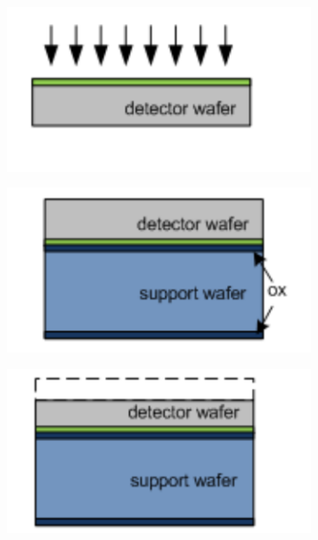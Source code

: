 \begin{figure}[htbp]
  \centering
  \begin{subfigure}[b]{0.3\textwidth}
    \centering
    \includegraphics[width=\textwidth]{figures/ActiveEdge/advacamProcess/wafer_1}
    \caption{}
  \end{subfigure}\hfill
  \begin{subfigure}[b]{0.3\textwidth}
    \includegraphics[width=\textwidth]{figures/ActiveEdge/advacamProcess/wafer_2}
    \caption{}
  \end{subfigure}\hfill
  \begin{subfigure}[b]{0.3\textwidth}
    \includegraphics[width=\textwidth]{figures/ActiveEdge/advacamProcess/wafer_3}
    \caption{}
  \end{subfigure}\\


\end{figure}
